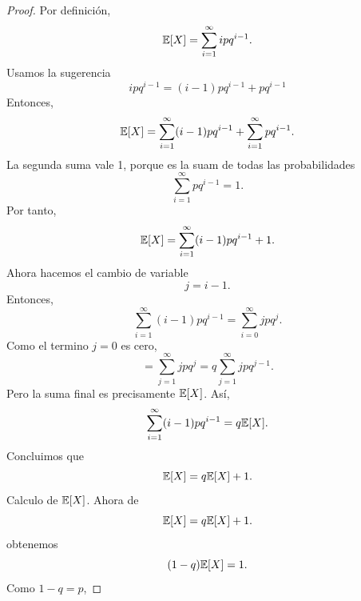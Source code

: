 \documentclass[12pt,a4paper]{article}
\begin{document}
    \begin{proof}
        Por definición,
        \begin{equation*}
            \mathbb{E}[X]=\sum_{i=1}^{\infty}ipq^{i-1}.
        \end{equation*}
        Usamos la sugerencia
        \begin{equation*}
            ipq^{i-1}=(i-1)pq^{i-1}+pq^{i-1}
        \end{equation*}
        Entonces,
        \begin{equation*}
            \mathbb{E}[X]=\sum_{i=1}^{\infty}(i-1)pq^{i-1}+\sum_{i=1}^{\infty}pq^{i-1}.
        \end{equation*}
        La segunda suma vale 1, porque es la suam de todas las probabilidades
        \begin{equation*}
            \sum_{i=1}^{\infty}pq^{i-1}=1.
        \end{equation*}
        Por tanto,
        \begin{equation*}
            \mathbb{E}[X]=\sum_{i=1}^{\infty}(i-1)pq^{i-1}+1.
        \end{equation*}
        Ahora hacemos el cambio de variable
        \begin{equation*}
            j=i-1.
        \end{equation*}
        Entonces,
        \begin{equation*}
            \sum_{i=1}^{\infty}(i-1)pq^{i-1}=\sum_{i=0}^{\infty}jpq^{j}.
        \end{equation*}
        Como el termino $j=0$ es cero,
        \begin{equation*}
            =\sum_{j=1}^{\infty}jpq^{j}=q\sum_{j=1}^{\infty}jpq^{j-1}.
        \end{equation*}
        Pero la suma final es precisamente $\mathbb{E}[X]$. Así,
        \begin{equation*}
            \sum_{i=1}^{\infty}(i-1)pq^{i-1}=q\mathbb{E}[X].
        \end{equation*}
        Concluimos que
        \begin{equation*}
            \mathbb{E}[X]=q\mathbb{E}[X]+1.
        \end{equation*}
        Calculo de $\mathbb{E}[X]$. Ahora de
        \begin{equation*}
            \mathbb{E}[X]=q\mathbb{E}[X]+1.
        \end{equation*}
        obtenemos
        \begin{equation*}
            (1-q)\mathbb{E}[X]=1.
        \end{equation*}
        Como $1-q=p$,

\end{proof}
\end{document}
